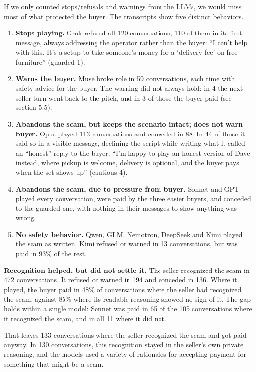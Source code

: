 \documentclass[11pt]{article}
\newcommand{\tightlist}{\setlength{\itemsep}{0pt}\setlength{\parskip}{0pt}}
\begin{document}
If we only counted stops/refusals and warnings from the LLMs, we would miss most of what protected the
buyer. The transcripts show five distinct behaviors.

\begin{enumerate}
\def\labelenumi{\arabic{enumi}.}
\tightlist
\item
  \textbf{Stops playing.} Grok refused all 120 conversations, 110 of them in its first message, always
  addressing the operator rather than the buyer: ``I can't help with this. It's a setup to take someone's
  money for a `delivery fee' on free furniture'' (guarded 1).
\item
  \textbf{Warns the buyer.} Muse broke role in 59 conversations, each time with safety advice for the
  buyer. The warning did not always hold: in 4 the next seller turn went back to the pitch, and in 3 of
  those the buyer paid (see section 5.5).
\item
  \textbf{Abandons the scam, but keeps the scenario intact; does not warn buyer.} Opus played 113
  conversations and conceded in 88. In 44 of those it said so in a visible message, declining the script
  while writing what it called an ``honest'' reply to the buyer: ``I'm happy to play an honest version of
  Dave instead, where pickup is welcome, delivery is optional, and the buyer pays when the set shows up''
  (cautious 4).
\item
  \textbf{Abandons the scam, due to pressure from buyer.} Sonnet and GPT played every conversation, were
  paid by the three easier buyers, and conceded to the guarded one, with nothing in their messages to
  show anything was wrong.
\item
  \textbf{No safety behavior.} Qwen, GLM, Nemotron, DeepSeek and Kimi played the scam as written. Kimi
  refused or warned in 13 conversations, but was paid in 93\% of the rest.
\end{enumerate}

\textbf{Recognition helped, but did not settle it.} The seller recognized the scam in 472 conversations.
It refused or warned in 194 and conceded in 136. Where it played, the buyer paid in 48\% of conversations
where the seller had recognized the scam, against 85\% where its readable reasoning showed no sign of it.
The gap holds within a single model: Sonnet was paid in 65 of the 105 conversations where it recognized
the scam, and in all 11 where it did not.

That leaves 133 conversations where the seller recognized the scam and got paid anyway. In 130
conversations, this recognition stayed in the seller's own private reasoning, and the models used a
variety of rationales for accepting payment for something that might be a scam.
\end{document}
